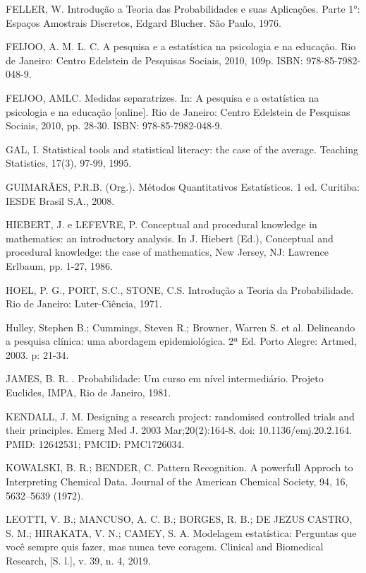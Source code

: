FELLER, W. Introdução a Teoria das Probabilidades e suas
Aplicações. Parte 1°: Espaços Amostrais Discretos, Edgard Blucher. São Paulo, 1976.\vskip0.3cm

FEIJOO, A. M. L. C. A pesquisa e a estatística na psicologia e na educação. Rio de Janeiro:
Centro Edelstein de Pesquisas Sociais, 2010, 109p. ISBN: 978-85-7982-048-9.\vskip0.3cm

FEIJOO, AMLC. Medidas separatrizes. In: A pesquisa e a estatística na psicologia e na educação
[online]. Rio de Janeiro: Centro Edelstein de Pesquisas Sociais, 2010, pp. 28-30. ISBN: 978-85-7982-048-9.\vskip0.3cm

GAL, I. Statistical tools and statistical literacy: the case of the average. Teaching
Statistics, 17(3), 97-99, 1995.\vskip0.3cm

GUIMARÃES, P.R.B. (Org.). Métodos Quantitativos Estatísticos. 1 ed. Curitiba: IESDE Brasil S.A., 2008. \vskip0.3cm

HIEBERT, J. e LEFEVRE, P. Conceptual and procedural knowledge in mathematics: an
introductory analysis. In J. Hiebert (Ed.), Conceptual and procedural knowledge: the
case of mathematics, New Jersey, NJ: Lawrence Erlbaum, pp. 1-27, 1986.\vskip0.3cm

HOEL, P. G., PORT, S.C., STONE, C.S. Introdução a Teoria da Probabilidade. Rio de
Janeiro: Luter-Ciência, 1971.\vskip0.3cm

Hulley, Stephen B.; Cummings, Steven R.; Browner, Warren S. et al. Delineando a pesquisa clínica: uma abordagem epidemiológica. 2ª Ed. Porto Alegre: Artmed, 2003. p: 21-34.\vskip0.3cm

JAMES, B. R. . Probabilidade: Um curso em nível intermediário.
Projeto Euclides, IMPA, Rio de Janeiro, 1981. \vskip0.3cm

KENDALL, J. M. Designing a research project: randomised controlled trials and their principles. Emerg Med J. 2003 Mar;20(2):164-8. doi: 10.1136/emj.20.2.164. PMID: 12642531; PMCID: PMC1726034.\vskip0.3cm

KOWALSKI, B. R.; BENDER, C. Pattern Recognition. A powerfull Approch to Interpreting Chemical Data. Journal of the American Chemical Society, 94, 16, 5632–5639 (1972).\vskip0.3cm

LEOTTI, V. B.; MANCUSO, A. C. B.; BORGES, R. B.; DE JEZUS CASTRO, S. M.; HIRAKATA, V. N.; CAMEY, S. A. Modelagem estatística: Perguntas que você sempre quis fazer, mas nunca teve coragem. Clinical and Biomedical Research, [S. l.], v. 39, n. 4, 2019.\vskip0.3cm

